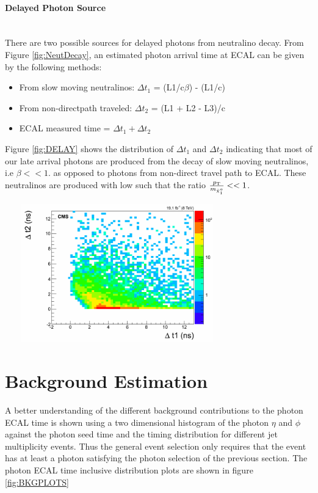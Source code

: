 \paragraph*{Delayed Photon Source} \mbox{}\\
There are two possible sources for delayed photons from neutralino decay.
From Figure \ref{fig:NeutDecay}, an estimated photon arrival time at ECAL can be given by the following methods:
\begin{itemize}
  \item From slow moving neutralinos: $\Delta t_1$ = (L1/c$\beta$) - (L1/c)
  \item From non-directpath traveled: $\Delta t_2$ = (L1 + L2 - L3)/c
  
  \item ECAL measured time = $\Delta t_{1} + \Delta t_{2}$
\end{itemize}
 
Figure \ref{fig:DELAY} shows the distribution of $\Delta t_{1}$ and $\Delta t_{2}$
indicating that most of our late arrival photons are produced from the decay of slow moving neutralinos, i.e $\beta << 1$. as opposed to photons from non-direct travel path to ECAL. These neutralinos are produced with low \pt such that the ratio $\frac{p_{\mathrm{T}}}{m_{\tilde{\chi}^{o}_{1}}} << 1$.


\begin{center}
\centering
\mbox{
\includegraphics[height=6cm, width=0.7\textwidth]{THESISPLOTS/dt1_dt2_late.png}}
\label{fig:DELAY}
\end{center}

\section{Background Estimation}
A better understanding of the different background contributions to the photon ECAL time is shown using a two dimensional histogram of the photon $\eta$ and $\phi$ against the photon seed time and the timing distribution for different jet multiplicity events. Thus the general event selection only requires that the event has at least a photon satisfying the photon selection of the previous section.
The photon ECAL time inclusive distribution plots are shown in figure \ref{fig:BKGPLOTS}

